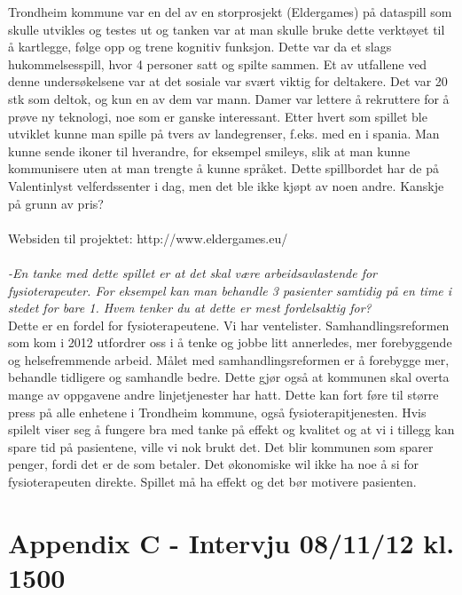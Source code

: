 Trondheim kommune var en del av en storprosjekt (Eldergames) på dataspill som skulle utvikles og testes ut og tanken var at man skulle bruke dette verktøyet til å kartlegge, følge opp og trene kognitiv funksjon. Dette var da et slags hukommelsesspill, hvor 
4 personer satt og spilte sammen. Et av utfallene ved denne undersøkelsene var at det sosiale var svært  viktig for deltakere. Det var 20 stk som deltok, og kun en av dem var mann. Damer var lettere å rekruttere for å prøve ny teknologi, noe som er ganske interessant. Etter hvert som spillet ble utviklet kunne man spille på tvers av landegrenser, f.eks. med en i spania. Man kunne sende ikoner til hverandre, for eksempel smileys, slik at man kunne kommunisere uten at man trengte å kunne språket. Dette spillbordet har de på Valentinlyst velferdssenter i dag, men det ble ikke kjøpt av noen andre. Kanskje på grunn av pris? \\ \\
Websiden til projektet: {http://www.eldergames.eu/} \\ \\
\emph{-En tanke med dette spillet er at det skal være arbeidsavlastende for fysioterapeuter. For eksempel kan man behandle 3 pasienter samtidig på en time i stedet for bare 1.  Hvem tenker du at dette er mest fordelsaktig for?}\\
Dette er en fordel for fysioterapeutene. Vi har ventelister. Samhandlingsreformen som kom i 2012 utfordrer oss i å tenke og jobbe litt annerledes, mer forebyggende og helsefremmende arbeid. Målet med samhandlingsreformen er å forebygge mer, behandle tidligere og samhandle bedre. Dette gjør også at kommunen skal overta mange av oppgavene andre linjetjenester har hatt. Dette kan fort føre til større press på alle enhetene i Trondheim kommune, også fysioterapitjenesten. Hvis spilelt viser seg å fungere bra med tanke på effekt og kvalitet og at vi i tillegg kan spare tid på pasientene, ville vi nok brukt det. Det blir kommunen som sparer penger, fordi det er de som betaler. Det økonomiske wil ikke ha noe å si for fysioterapeuten direkte. Spillet må ha effekt og det bør motivere pasienten. 

\newpage
\section*{Appendix C - Intervju 08/11/12 kl. 1500}
\label{C}

